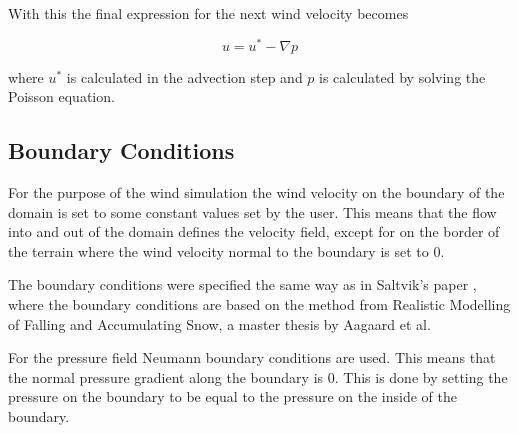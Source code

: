 With this the final expression for the next wind velocity becomes

$$ u = u^* - \nabla p $$

where $u^*$ is calculated in the advection step and $p$ is calculated by solving
the Poisson equation.

\subsection{Boundary Conditions}

For the purpose of the wind simulation the wind velocity on the boundary of the
domain is set to some constant values set by the user. This means that the flow
into and out of the domain defines the velocity field, except for on the border
of the terrain where the wind velocity normal to the boundary is set to 0.

The boundary conditions were specified the same way as in Saltvik's paper
\cite{originalSnowThesis}, where the boundary conditions are based 
on the method from Realistic Modelling of Falling and Accumulating Snow, a master
thesis by Aagaard et al\cite{danishSnowThesis}. 

For the pressure field Neumann boundary conditions are used. This means that
the normal pressure gradient along the boundary is 0. This is done by setting
the pressure on the boundary to be equal to the pressure on the inside of the 
boundary.
